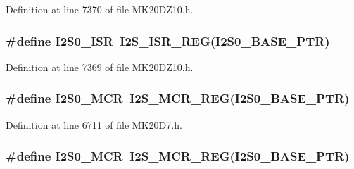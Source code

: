 Definition at line 7370 of file M\+K20\+D\+Z10.\+h.

\subsubsection[{\texorpdfstring{I2\+S0\+\_\+\+I\+SR}{I2S0_ISR}}]{\setlength{\rightskip}{0pt plus 5cm}\#define I2\+S0\+\_\+\+I\+SR~{\bf I2\+S\+\_\+\+I\+S\+R\+\_\+\+R\+EG}({\bf I2\+S0\+\_\+\+B\+A\+S\+E\+\_\+\+P\+TR})}\hypertarget{group___i2_s___register___accessor___macros_gab7bd57c0f699fc5253e9240394467b0e}{}\label{group___i2_s___register___accessor___macros_gab7bd57c0f699fc5253e9240394467b0e}


Definition at line 7369 of file M\+K20\+D\+Z10.\+h.

\subsubsection[{\texorpdfstring{I2\+S0\+\_\+\+M\+CR}{I2S0_MCR}}]{\setlength{\rightskip}{0pt plus 5cm}\#define I2\+S0\+\_\+\+M\+CR~{\bf I2\+S\+\_\+\+M\+C\+R\+\_\+\+R\+EG}({\bf I2\+S0\+\_\+\+B\+A\+S\+E\+\_\+\+P\+TR})}\hypertarget{group___i2_s___register___accessor___macros_gafd58fc2e9d6a222f72cda740be00c968}{}\label{group___i2_s___register___accessor___macros_gafd58fc2e9d6a222f72cda740be00c968}


Definition at line 6711 of file M\+K20\+D7.\+h.

\subsubsection[{\texorpdfstring{I2\+S0\+\_\+\+M\+CR}{I2S0_MCR}}]{\setlength{\rightskip}{0pt plus 5cm}\#define I2\+S0\+\_\+\+M\+CR~{\bf I2\+S\+\_\+\+M\+C\+R\+\_\+\+R\+EG}({\bf I2\+S0\+\_\+\+B\+A\+S\+E\+\_\+\+P\+TR})}\hypertarget{group___i2_s___register___accessor___macros_gafd58fc2e9d6a222f72cda740be00c968}{}\label{group___i2_s___register___accessor___macros_gafd58fc2e9d6a222f72cda740be00c968}


